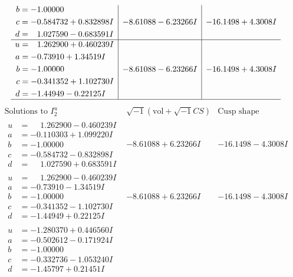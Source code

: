 \documentclass[1p]{elsarticle_modified}
\theoremstyle{definition}
\newcommand{\I}{\sqrt{-1}}
\begin{document}
$$\begin{array}{c|c|c}
\begin{aligned}
b &= -1.00000\phantom{ +0.000000I} \\
c &= -0.584732 + 0.832898 I \\
d &= \phantom{-}1.027590 - 0.683591 I\end{aligned}
 & -8.61088 - 6.23266 I & -16.1498 + 4.3008 I \\ \hline\begin{aligned}
u &= \phantom{-}1.262900 + 0.460239 I \\
a &= -0.73910 + 1.34519 I \\
b &= -1.00000\phantom{ +0.000000I} \\
c &= -0.341352 + 1.102730 I \\
d &= -1.44949 - 0.22125 I\end{aligned}
 & -8.61088 - 6.23266 I & -16.1498 + 4.3008 I\\
 \hline 
 \end{array}$$\newpage$$\begin{array}{c|c|c}  
\text{Solutions to }I^u_{2}& \I (\text{vol} + \sqrt{-1}CS) & \text{Cusp shape}\\
 \hline 
\begin{aligned}
u &= \phantom{-}1.262900 - 0.460239 I \\
a &= -0.110303 + 1.099220 I \\
b &= -1.00000\phantom{ +0.000000I} \\
c &= -0.584732 - 0.832898 I \\
d &= \phantom{-}1.027590 + 0.683591 I\end{aligned}
 & -8.61088 + 6.23266 I & -16.1498 - 4.3008 I \\ \hline\begin{aligned}
u &= \phantom{-}1.262900 - 0.460239 I \\
a &= -0.73910 - 1.34519 I \\
b &= -1.00000\phantom{ +0.000000I} \\
c &= -0.341352 - 1.102730 I \\
d &= -1.44949 + 0.22125 I\end{aligned}
 & -8.61088 + 6.23266 I & -16.1498 - 4.3008 I \\ \hline\begin{aligned}
u &= -1.280370 + 0.446560 I \\
a &= -0.502612 - 0.171924 I \\
b &= -1.00000\phantom{ +0.000000I} \\
c &= -0.332736 - 1.053240 I \\
d &= -1.45797 + 0.21451 I\end{aligned}

\end{array}$$
\end{document}
